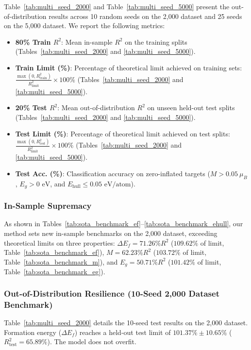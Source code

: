 \documentclass[12pt,onecolumn]{elsarticle}
\begin{document}
Table~\ref{tab:multi_seed_2000} and Table~\ref{tab:multi_seed_5000} present the out-of-distribution results across 10 random seeds on the 2,000 dataset and 25 seeds on the 5,000 dataset. We report the following metrics:
\begin{itemize}
\item \textbf{80\% Train $R^2$}: Mean in-sample $R^2$ on the training splits (Tables~\ref{tab:multi_seed_2000} and \ref{tab:multi_seed_5000}).
\item \textbf{Train Limit (\%)}: Percentage of theoretical limit achieved on training sets: $\frac{\max(0, R^2_{\text{train}})}{R^2_{\text{limit}}} \times 100\%$ (Tables~\ref{tab:multi_seed_2000} and \ref{tab:multi_seed_5000}).
\item \textbf{20\% Test $R^2$}: Mean out-of-distribution $R^2$ on unseen held-out test splits (Tables~\ref{tab:multi_seed_2000} and \ref{tab:multi_seed_5000}).
\item \textbf{Test Limit (\%)}: Percentage of theoretical limit achieved on test splits: $\frac{\max(0, R^2_{\text{test}})}{R^2_{\text{limit}}} \times 100\%$ (Tables~\ref{tab:multi_seed_2000} and \ref{tab:multi_seed_5000}).
\item \textbf{Test Acc. (\%)}: Classification accuracy on zero-inflated targets ($M > 0.05\ \mu_B$, $E_g > 0\text{ eV}$, and $E_{\text{hull}} \le 0.05\text{ eV/atom}$).
\end{itemize}

\subsubsection{In-Sample Supremacy}
As shown in Tables~\ref{tab:sota_benchmark_ef}--\ref{tab:sota_benchmark_ehull}, our method sets new in-sample benchmarks on the 2,000 dataset, exceeding theoretical limits on three properties: $\Delta E_f = 71.26\% R^2$ ($109.62\%$ of limit, Table~\ref{tab:sota_benchmark_ef}), $M = 62.23\% R^2$ ($103.72\%$ of limit, Table~\ref{tab:sota_benchmark_m}), and $E_g = 50.71\% R^2$ ($101.42\%$ of limit, Table~\ref{tab:sota_benchmark_eg}).

\subsubsection{Out-of-Distribution Resilience (10-Seed 2,000 Dataset Benchmark)}
Table~\ref{tab:multi_seed_2000} details the 10-seed test results on the 2,000 dataset. Formation energy ($\Delta E_f$) reaches a held-out test limit of \textbf{$101.37\% \pm 10.65\%$} ($R^2_{\text{test}} = 65.89\%$). The model does not overfit.
\end{document}

